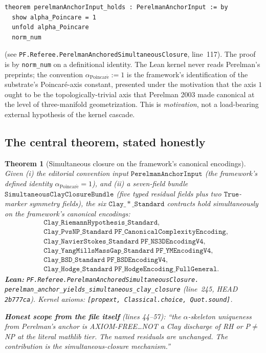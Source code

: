 \documentclass[11pt,a4paper]{article}
\theoremstyle{plain}
\newtheorem{theorem}{Theorem}[section]
\theoremstyle{definition}
\begin{document}
\begin{verbatim}
theorem perelmanAnchorInput_holds : PerelmanAnchorInput := by
  show alpha_Poincare = 1
  unfold alpha_Poincare
  norm_num
\end{verbatim}

\noindent
(see \texttt{PF.Referee.PerelmanAnchoredSimultaneousClosure},
line~117). The proof is by \texttt{norm\_num} on a definitional
identity. The Lean kernel never reads Perelman's preprints; the
convention $\alpha_{\mathrm{Poincar\acute e}} := 1$ is the
framework's identification of the substrate's Poincar\'e-axis
constant, presented under the motivation that the axis $1$ ought
to be the topologically-trivial axis that Perelman 2003 made
canonical at the level of three-manifold geometrization. This is
\emph{motivation}, not a load-bearing external hypothesis of the
kernel cascade.

\subsection{The central theorem, stated honestly}
\label{sec:central-statement}

\begin{theorem}[Simultaneous closure on the framework's canonical
encodings]
\label{thm:central}
Given (i) the editorial convention input
$\mathtt{PerelmanAnchorInput}$ (the framework's defined identity
$\alpha_{\mathrm{Poincar\acute e}} = 1$), and (ii) a seven-field
bundle $\mathtt{SimultaneousClayClosureBundle}$ (five typed
residual fields plus two $\mathtt{True}$-marker symmetry fields),
the six $\mathtt{Clay\_*\_Standard}$ contracts hold simultaneously
\emph{on the framework's canonical encodings}:
\begin{align*}
&\mathtt{Clay\_RiemannHypothesis\_Standard}, \\
&\mathtt{Clay\_PvsNP\_Standard\;PF\_CanonicalComplexityEncoding}, \\
&\mathtt{Clay\_NavierStokes\_Standard\;PF\_NS3DEncodingV4}, \\
&\mathtt{Clay\_YangMillsMassGap\_Standard\;PF\_YMEncodingV4}, \\
&\mathtt{Clay\_BSD\_Standard\;PF\_BSDEncodingV4}, \\
&\mathtt{Clay\_Hodge\_Standard\;PF\_HodgeEncoding\_FullGeneral}.
\end{align*}
\textbf{Lean:}
\texttt{PF.Referee.PerelmanAnchoredSimultaneousClosure.\\
perelman\_anchor\_yields\_simultaneous\_clay\_closure}
(line~245, HEAD \texttt{2b777ca}). Kernel axioms:
\texttt{[propext, Classical.choice, Quot.sound]}.

\medskip\noindent
\textbf{Honest scope from the file itself} (lines 44--57): ``the
$\alpha$-skeleton uniqueness from Perelman's anchor is
AXIOM-FREE\ldots NOT a Clay discharge of RH or
P$\neq$NP at the literal mathlib tier. The named residuals are
unchanged. The contribution is the simultaneous-closure
\emph{mechanism}.''
\end{theorem}
\end{document}
